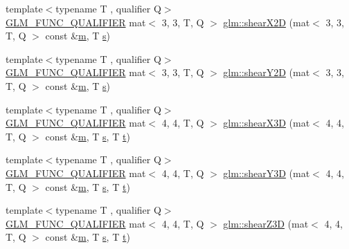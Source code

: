 \begin{DoxyCompactItemize}
\item 
{\footnotesize template$<$typename T , qualifier Q$>$ }\\\hyperlink{setup_8hpp_a33fdea6f91c5f834105f7415e2a64407}{G\+L\+M\+\_\+\+F\+U\+N\+C\+\_\+\+Q\+U\+A\+L\+I\+F\+I\+ER} mat$<$ 3, 3, T, Q $>$ \hyperlink{group__gtx__transform2_gabf714b8a358181572b32a45555f71948}{glm\+::shear\+X2D} (mat$<$ 3, 3, T, Q $>$ const \&\hyperlink{_s_d_l__opengl__glext_8h_af593500c283bf1a787a6f947f503a5c2}{m}, T \hyperlink{_s_d_l__opengl_8h_a4af680a6c683f88ed67b76f207f2e6e4}{s})
\item 
{\footnotesize template$<$typename T , qualifier Q$>$ }\\\hyperlink{setup_8hpp_a33fdea6f91c5f834105f7415e2a64407}{G\+L\+M\+\_\+\+F\+U\+N\+C\+\_\+\+Q\+U\+A\+L\+I\+F\+I\+ER} mat$<$ 3, 3, T, Q $>$ \hyperlink{group__gtx__transform2_gac7998d0763d9181550c77e8af09a182c}{glm\+::shear\+Y2D} (mat$<$ 3, 3, T, Q $>$ const \&\hyperlink{_s_d_l__opengl__glext_8h_af593500c283bf1a787a6f947f503a5c2}{m}, T \hyperlink{_s_d_l__opengl_8h_a4af680a6c683f88ed67b76f207f2e6e4}{s})
\item 
{\footnotesize template$<$typename T , qualifier Q$>$ }\\\hyperlink{setup_8hpp_a33fdea6f91c5f834105f7415e2a64407}{G\+L\+M\+\_\+\+F\+U\+N\+C\+\_\+\+Q\+U\+A\+L\+I\+F\+I\+ER} mat$<$ 4, 4, T, Q $>$ \hyperlink{group__gtx__transform2_ga73e867c6cd4d700fe2054437e56106c4}{glm\+::shear\+X3D} (mat$<$ 4, 4, T, Q $>$ const \&\hyperlink{_s_d_l__opengl__glext_8h_af593500c283bf1a787a6f947f503a5c2}{m}, T \hyperlink{_s_d_l__opengl_8h_a4af680a6c683f88ed67b76f207f2e6e4}{s}, T \hyperlink{_s_d_l__opengl_8h_a7d65d00ca3b0630d9b5c52df855b19f5}{t})
\item 
{\footnotesize template$<$typename T , qualifier Q$>$ }\\\hyperlink{setup_8hpp_a33fdea6f91c5f834105f7415e2a64407}{G\+L\+M\+\_\+\+F\+U\+N\+C\+\_\+\+Q\+U\+A\+L\+I\+F\+I\+ER} mat$<$ 4, 4, T, Q $>$ \hyperlink{group__gtx__transform2_gade5bb65ffcb513973db1a1314fb5cfac}{glm\+::shear\+Y3D} (mat$<$ 4, 4, T, Q $>$ const \&\hyperlink{_s_d_l__opengl__glext_8h_af593500c283bf1a787a6f947f503a5c2}{m}, T \hyperlink{_s_d_l__opengl_8h_a4af680a6c683f88ed67b76f207f2e6e4}{s}, T \hyperlink{_s_d_l__opengl_8h_a7d65d00ca3b0630d9b5c52df855b19f5}{t})
\item 
{\footnotesize template$<$typename T , qualifier Q$>$ }\\\hyperlink{setup_8hpp_a33fdea6f91c5f834105f7415e2a64407}{G\+L\+M\+\_\+\+F\+U\+N\+C\+\_\+\+Q\+U\+A\+L\+I\+F\+I\+ER} mat$<$ 4, 4, T, Q $>$ \hyperlink{group__gtx__transform2_ga6591e0a3a9d2c9c0b6577bb4dace0255}{glm\+::shear\+Z3D} (mat$<$ 4, 4, T, Q $>$ const \&\hyperlink{_s_d_l__opengl__glext_8h_af593500c283bf1a787a6f947f503a5c2}{m}, T \hyperlink{_s_d_l__opengl_8h_a4af680a6c683f88ed67b76f207f2e6e4}{s}, T \hyperlink{_s_d_l__opengl_8h_a7d65d00ca3b0630d9b5c52df855b19f5}{t})

\end{DoxyCompactItemize}
